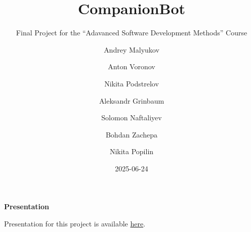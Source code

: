 \documentclass[
  letterpaper,
  DIV=11,
  numbers=noendperiod]{scrartcl}
\title{CompanionBot}
\subtitle{Final Project for the ``Adavanced Software Development
Methods'' Course}
\author{Andrey Malyukov \and Anton Voronov \and Nikita
Podstrelov \and Aleksandr Grinbaum \and Solomon Naftaliyev \and Bohdan
Zachepa \and Nikita Popilin}
\date{2025-06-24}
\renewcommand*\contentsname{Table of contents}
\newcommand\contentsname{Table of contents}
\begin{document}
\maketitle

\renewcommand*\contentsname{Table of contents}
{
\hypersetup{linkcolor=}
\setcounter{tocdepth}{3}
\tableofcontents
}

\begin{tcolorbox}[enhanced jigsaw, opacityback=0, toprule=.15mm, leftrule=.75mm, colframe=quarto-callout-tip-color-frame, arc=.35mm, rightrule=.15mm, breakable, bottomrule=.15mm, left=2mm, colback=white]
\begin{minipage}[t]{5.5mm}
\textcolor{quarto-callout-tip-color}{\faLightbulb}
\end{minipage}%
\begin{minipage}[t]{\textwidth - 5.5mm}

\vspace{-3mm}\textbf{Presentation}\vspace{3mm}

Presentation for this project is available
\href{./companionbot-presentation.pdf}{here}.

\end{minipage}%
\end{tcolorbox}

\newpage{}
\end{document}
